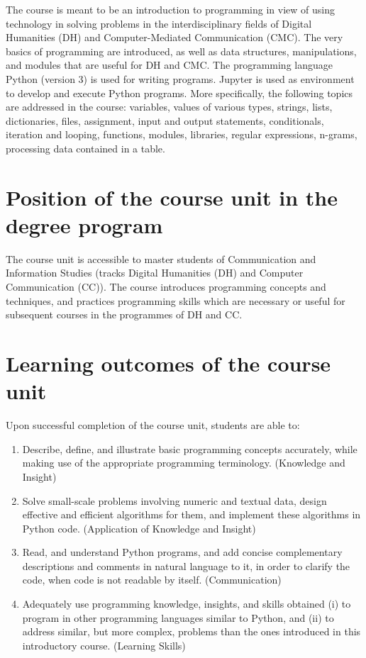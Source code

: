 \documentclass[a4paper,12pt]{article}
\begin{document}
The course is meant to be an introduction to programming in view of using
technology in solving problems in the interdisciplinary fields of Digital
Humanities (DH) and Computer-Mediated Communication (CMC). The very basics of
programming are introduced, as well as data structures, manipulations, and
modules that are useful for DH and CMC. The programming language Python
(version 3) is used for writing programs. Jupyter is used as environment to
develop and execute Python programs. More specifically, the following topics
are addressed in the course: variables, values of various types, strings,
lists, dictionaries, files, assignment, input and output statements,
conditionals, iteration and looping, functions, modules, libraries, regular
expressions, n-grams, processing data contained in a table.

\section{Position of the course unit in the degree program}
The course unit is accessible to master students of Communication and
Information Studies (tracks Digital Humanities (DH) and Computer Communication
(CC)). The course introduces programming concepts and techniques, and practices
programming skills which are necessary or useful for subsequent courses in the
programmes of DH and CC.

\section{Learning outcomes of the course unit}

Upon successful completion of the course unit, students are able to:
\begin{enumerate}
	\item Describe, define, and illustrate basic programming concepts
		accurately, while making use of the appropriate programming
		terminology. (Knowledge and Insight)
	\item Solve small-scale problems involving numeric and textual data, design
		effective and efficient algorithms for them, and implement these
		algorithms in Python code. (Application of Knowledge and Insight)
	\item Read, and understand Python programs, and add concise complementary
		descriptions and comments in natural language to it, in order to
		clarify the code, when code is not readable by itself. (Communication)
	\item Adequately use programming knowledge, insights, and skills obtained
		(i) to program in other programming languages similar to Python, and
		(ii) to address similar, but more complex, problems than the ones
		introduced in this introductory course. (Learning Skills)
\end{enumerate}
\end{document}
